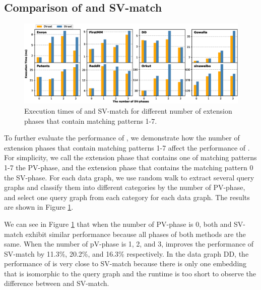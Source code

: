 \subsection{Comparison of \SystemName and SV-match} \label{sec:comparesv}
\begin{figure}
\centering
\includegraphics[width=\textwidth]{./figure/compareSV.eps}
\caption{Execution times of \SystemName and SV-match for different number of extension phases that contain matching patterns 1-7.}	
\label{fig:compareSV}
\end{figure}
To further evaluate the performance of \SystemName, we demonstrate how the number of extension phases that contain matching patterns 1-7 affect the performance of \SystemName. For simplicity, we call the extension phase that contains one of matching patterns 1-7 the PV-phase, and the extension phase that contains the matching pattern 0 the SV-phase. For each data graph, we use random walk to extract several query graphs and classify them into different categories by the number of PV-phase, and select one query graph from each category for each data graph. The results are shown in Figure \ref{fig:compareSV}.

We can see in Figure \ref{fig:compareSV} that when the number of PV-phase is 0, both \SystemName and SV-match exhibit similar performance because all phases of both methods are the same. When the number of pV-phase is 1, 2, and 3, \SystemName improves the performance of SV-match by 11.3\%, 20.2\%, and 16.3\% respectively. In the data graph DD, the performance of \SystemName is very close to SV-match because there is only one embedding that is isomorphic to the query graph and the runtime is too short to observe the difference between \SystemName and SV-match.